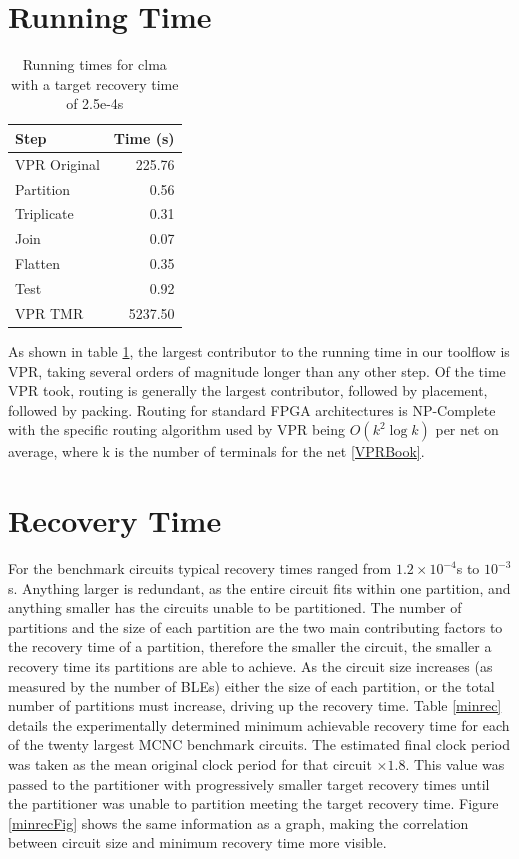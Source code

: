 \documentclass[12pt,final,oneside]{dwThesis} %
\begin{document}
   \section{Running Time}\label{timing}
   
   \begin{table}
   \begin{tabular}{lr}
	\toprule
   	Step & Time (s) \\
   	\midrule
   	VPR Original & 225.76\\
   	Partition & 0.56 \\
   	Triplicate & 0.31 \\
   	Join & 0.07 \\
   	Flatten & 0.35 \\
   	Test & 0.92 \\
   	VPR TMR & 5237.50\\
   	\bottomrule
   \end{tabular}
   \caption{Running times for clma with a target recovery time of 2.5e-4s}\label{runningtimes}
   \end{table}
   As shown in table \ref{runningtimes}, the largest contributor to the running time in our toolflow is \gls{VPR}, taking several orders of magnitude longer than any other step. Of the time \gls{VPR} took, routing is generally the largest contributor, followed by placement, followed by packing.
   Routing for standard \gls{FPGA} architectures is NP-Complete \cite{npcomplete} with the specific routing algorithm used by \gls{VPR} being $O(k^2\log{k})$ per net on average,
   where k is the number of terminals for the net \ref{VPRBook}.
   


   \section{Recovery Time}
    For the benchmark circuits typical recovery times ranged from $1.2\times10^{-4}$s to $10^{-3}$s. Anything larger is redundant, as the entire circuit fits within one partition, and anything smaller has the circuits unable to be partitioned. The number of partitions and the size of each partition are the two main contributing factors to the recovery time of a partition, therefore the smaller the circuit, the smaller a recovery time its partitions are able to achieve. As the circuit size increases (as measured by the number of \glspl{BLE}) either the size of each partition, or the total number of partitions must increase, driving up the recovery time.
    Table \ref{minrec} details the experimentally determined minimum achievable recovery time for each of the twenty largest \gls{MCNC} benchmark circuits. The estimated final clock period was taken as the mean original clock period for that circuit $\times 1.8$. This value was passed to the partitioner with progressively smaller target recovery times until the partitioner was unable to partition meeting the target recovery time.
    Figure \ref{minrecFig} shows the same information as a graph, making the correlation between circuit size and minimum recovery time more visible.
    
\end{document}
